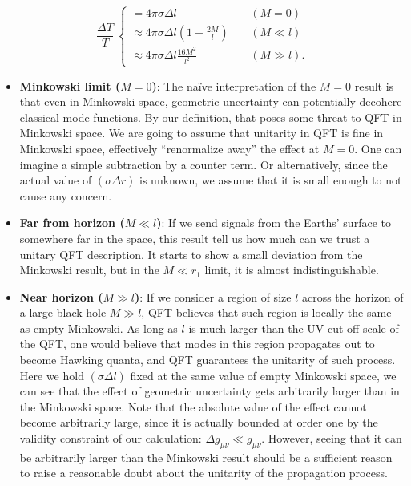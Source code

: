 \documentclass[aps,showpacs,onecolumn,floats,prd,superscriptaddress,nofootinbib]{revtex4-1}
\begin{document}
\begin{equation}
\frac{\Delta T}{T} ~ \begin{cases}
= 4 \pi \sigma \Delta l~	 &\ \ \ \ \ (M = 0)\\
\approx 4\pi \sigma \Delta l \left( 1 + \frac{2M}{l} \right) & \ \ \ \ \ (M \ll l)	\\
\approx 4 \pi  \sigma \Delta l \frac{16M^2}{l^2} & \ \ \ \ \ (M \gg l).
\end{cases}	\label{fin-result}
\end{equation}

\begin{itemize}

\item \textbf{Minkowski limit ($M=0$)}: 
The na\"ive interpretation of the $M=0$ result is that even in Minkowski space, geometric uncertainty can potentially decohere classical mode functions.
By our definition, that poses some threat to QFT in Minkowski space.
We are going to assume that unitarity in QFT is fine in Minkowski space, effectively ``renormalize away'' the effect at $M=0$.
One can imagine a simple subtraction by a counter term.
Or alternatively, since the actual value of $(\sigma\Delta r)$ is unknown, we assume that it is small enough to not cause any concern.

\item \textbf{Far from horizon ($M \ll l$)}: 
If we send signals from the Earths' surface to somewhere far in the space, this result tell us how much can we trust a unitary QFT description.
It starts to show a small deviation from the Minkowski result, but in the $M \ll r_1$ limit, it is almost indistinguishable. 

\item \textbf{Near horizon ($M \gg l$)}: 
If we consider a region of size $l$ across the horizon of a large black hole $M\gg l$, QFT believes that such region is locally the same as empty Minkowski.
As long as $l$ is much larger than the UV cut-off scale of the QFT, one would believe that modes in this region propagates out to become Hawking quanta, and QFT guarantees the unitarity of such process.
Here we hold $(\sigma\Delta l)$ fixed at the same value of empty Minkowski space, we can see that the effect of geometric uncertainty gets arbitrarily larger than in the Minkowski space.
Note that the absolute value of the effect cannot become arbitrarily large, since it is actually bounded at order one by the validity constraint of our calculation: $\Delta g_{\mu\nu} \ll g_{\mu\nu}$.
However, seeing that it can be arbitrarily larger than the Minkowski result should be a sufficient reason to raise a reasonable doubt about the unitarity of the propagation process.

\end{itemize}
\end{document}
